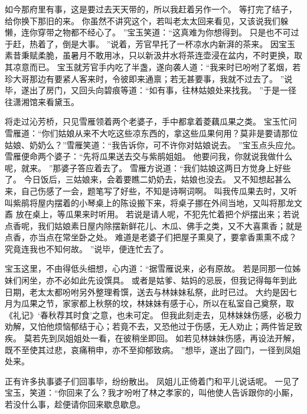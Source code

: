 如今那府里有事，这是要过去天天带的，所以我赶着另作一个。
等打完了结子，给你换下那旧的来。
你虽然不讲究这个，若叫老太太回来看见，又该说我们躲懒，连你穿带之物都不经心了。
”宝玉笑道：“这真难为你想得到。
只是也不可过于赶，热着了，倒是大事。
”说着，芳官早托了一杯凉水内新湃的茶来。
因宝玉素昔秉赋柔脆，虽暑月不敢用冰，只以新汲井水将茶连壶浸在盆内，不时更换，取其凉意而已。
宝玉就芳官手内吃了半盏，遂向袭人道：“我来时已吩咐了茗烟，若珍大哥那边有要紧人客来时，令彼即来通禀；若无甚要事，我就不过去了。
”说毕，遂出了房门，又回头向碧痕等道：“如有事，往林姑娘处来找我。
”于是一径往潇湘馆来看黛玉。
\par
将走过沁芳桥，只见雪雁领着两个老婆子，手中都拿着菱藕瓜果之类。
宝玉忙问雪雁道：“你们姑娘从来不大吃这些凉东西的，拿这些瓜果何用？莫非是要请那位姑娘、奶奶么？”雪雁笑道：“我告诉你，可不许你对姑娘说去。
”宝玉点头应允。
雪雁便命两个婆子：“先将瓜果送去交与紫鹃姐姐。
他要问我，你就说我做什么呢，就来。
”那婆子答应着去了。
雪雁方说道：“我们姑娘这两日方觉身上好些了。
今日饭后，三姑娘来，会着要瞧二奶奶去，姑娘也没去。
又不知想起甚么来，自己伤感了一会，题笔写了好些，不知是诗啊词啊。
叫我传瓜果去时，又听叫紫鹃将屋内摆着的小琴桌上的陈设搬下来，将桌子挪在外间当地，又叫将那龙文鼒
放在桌上，等瓜果来时听用。
若说是请人呢，不犯先忙着把个炉摆出来；若说点香呢，我们姑娘素日屋内除摆新鲜花儿、木瓜、佛手之类，又不大喜熏香；就是点香，亦当点在常坐卧之处。
难道是老婆子们把屋子熏臭了，要拿香熏熏不成？究竟连我也不知何故。
”说毕，便连忙去了。
\par
宝玉这里，不由得低头细想，心内道：“据雪雁说来，必有原故。
若是同那一位姊妹们闲坐，亦不必如此先设馔具。
或者是姑爹、姑妈的忌辰，但我记得每年到此日期，老太太都吩咐另外整理肴馔，送去与林妹妹私祭，此时已过。
大约是因七月为瓜果之节，家家都上秋祭的坟，林妹妹有感于心，所以在私室自己奠祭，取《礼记》‘春秋荐其时食’之意，也未可定。
但我此刻走去，见林妹妹伤感，必极力劝解，又怕他烦恼郁结于心；若竟不去，又恐他过于伤感，无人劝止；两件皆足致疾。
莫若先到凤姐姐处一看，在彼稍坐即回。
如若见林妹妹伤感，再设法开解，既不至使其过悲，哀痛稍申，亦不至抑郁致病。
”想毕，遂出了园门，一径到凤姐处来。
\par
正有许多执事婆子们回事毕，纷纷散出。
凤姐儿正倚着门和平儿说话呢。
一见了宝玉，笑道：“你回来了么？我才吩咐了林之孝家的，叫他使人告诉跟你的小厮，若没什么事，趁便请你回来歇息歇息。
